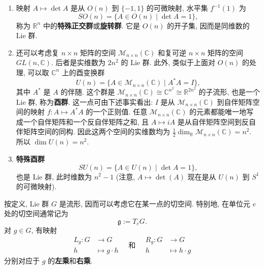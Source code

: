 \begin{RiemannExample}
\begin{enumerate}[label=(\arabic*),ref=\arabic*,leftmargin=*]
\begin{align*}
  (\mathrm{d}f)_A(B)
  &=\lim_{h\to0}\frac{\det(A+hB)-\det A}{h}\\
  &=\lim_{h\to0}\frac{(\det A)\det(I+hA^{-1}B)-\det A}{h}\\
  &=(\det A)\lim_{h\to0}\frac{\det(I+hA^{-1}B)-1}{h}\\
  &=(\det A)(\mathrm{d}f)_I(A^{-1}B)
   =(\det A)\operatorname{tr}(A^{-1}B).
\end{align*}
由于 $\det(A)=1$, 对任意 $k\in\mathbb{R}$, 取矩阵 $B=\frac{k}{n}A$, 就有 $(\mathrm{d}f)_A(B)=\operatorname{tr}(\frac{k}{n}I)=k$. 因此, 对每个 $A\in SL(n)$, $(\mathrm{d}f)_A$ 都是满射, 所以 $1$ 是 $f$ 的一个正则值. 于是 $SL(n)$ 是 $GL(n)$ 的一个子流形. 和前一个例子一样, 群乘法和求逆可微, 所以 $SL(n)$ 是 Lie 群.
\item 映射 $A\mapsto\det A$ 是从 $O(n)$ 到 $\{-1,1\}$ 的可微映射, 水平集 $f^{-1}(1)$ 为
\[
  SO(n)=\{A\in O(n)\mid\det A=1\},
\]
称为 $\mathbb{R}^n$ 中的\textbf{特殊正交群}或\textbf{旋转群}. 它是 $O(n)$ 的开子集, 因而是同维数的 Lie 群.
\item 还可以考虑复 $n\times n$ 矩阵的空间 $\mathcal M_{n\times n}(\mathbb C)$ 和复可逆 $n\times n$ 矩阵的空间 $GL(n,\mathbb C)$. 后者是实维数为 $2n^2$ 的 Lie 群. 此外, 类似于上面对 $O(n)$ 的处理, 可以取 $\mathbb{C}^n$ 上的酉变换群
\[
  U(n)=\{A\in\mathcal M_{n\times n}(\mathbb{C})\mid A^*A=I\},
\]
其中 $A^*$ 是 $A$ 的伴随. 这个群是 $\mathcal M_{n\times n}(\mathbb{C})\cong\mathbb{C}^{n^2}\cong\mathbb{R}^{2n^2}$ 的子流形, 也是一个 Lie 群, 称为\textbf{酉群}. 这一点可由下述事实看出: $I$ 是从 $\mathcal M_{n\times n}(\mathbb{C})$ 到自伴矩阵空间的映射 $f:A\mapsto A^*A$ 的一个正则值. 任意 $\mathcal M_{n\times n}(\mathbb{C})$ 的元素都能唯一地写成一个自伴矩阵和一个反自伴矩阵之和, 且 $A\mapsto iA$ 是从自伴矩阵空间到反自伴矩阵空间的同构. 因此这两个空间的实维数均为 $\frac12\dim_{\mathbb{R}}\mathcal M_{n\times n}(\mathbb{C})=n^2$. 所以 $\dim U(n)=n^2$.
\item \textbf{特殊酉群}
\[
  SU(n)=\{A\in U(n)\mid\det A=1\},
\]
也是 Lie 群, 此时维数为 $n^2-1$ (注意, $A\mapsto\det(A)$ 现在是从 $U(n)$ 到 $S^1$ 的可微映射).
\end{enumerate}
\end{RiemannExample}

按定义, Lie 群 $G$ 是流形, 因而可以考虑它在某一点的切空间. 特别地, 在单位元 $e$ 处的切空间通常记为
\[
  \mathfrak g:=T_eG.
\]
对 $g\in G$, 有映射
\[
  \begin{aligned}
    L_g:G&\to G\\ h&\mapsto g\cdot h
  \end{aligned}
  \quad\text{和}\quad
  \begin{aligned}
    R_g:G&\to G\\ h&\mapsto h\cdot g
  \end{aligned}
\]
分别对应于 $g$ 的\textbf{左乘}和\textbf{右乘}.

